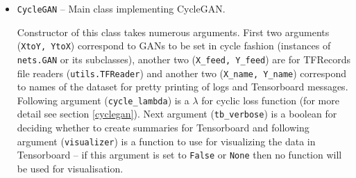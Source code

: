 \begin{itemize}
\item \texttt{CycleGAN} -- Main class implementing CycleGAN.
\begin{description}
 Constructor of this class takes numerous arguments. First two arguments (\texttt{XtoY, YtoX}) correspond to GANs to be set in cycle fashion (instances of \texttt{nets.GAN} or its subclasses), another two (\texttt{X\_feed, Y\_feed}) are for TFRecords file readers (\texttt{utils.TFReader}) and another two (\texttt{X\_name, Y\_name}) correspond to names of the dataset for pretty printing of logs and Tensorboard messages. Following argument (\texttt{cycle\_lambda}) is a $\lambda$ for cyclic loss function (for more detail see section \ref{cyclegan}). Next argument (\texttt{tb\_verbose}) is a boolean for deciding whether to create summaries for Tensorboard and following argument (\texttt {visualizer}) is a function to use for visualizing the data in Tensorboard -- if this argument is set to \texttt{False} or \texttt{None} then no function will be used for visualisation.


\end{description}
\end{itemize}
